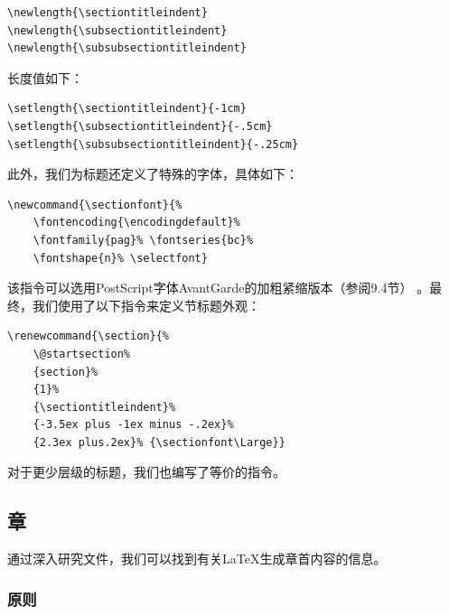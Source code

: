 \begin{dmd}
\begin{verbatim}
\newlength{\sectiontitleindent}
\newlength{\subsectiontitleindent}
\newlength{\subsubsectiontitleindent}
\end{verbatim}
\end{dmd}

长度值如下：

\begin{dmd}
\begin{verbatim}
\setlength{\sectiontitleindent}{-1cm}
\setlength{\subsectiontitleindent}{-.5cm}
\setlength{\subsubsectiontitleindent}{-.25cm}
\end{verbatim}
\end{dmd}

此外，我们为标题还定义了特殊的字体，具体如下：

\begin{dmd}
\begin{verbatim}
\newcommand{\sectionfont}{% 
    \fontencoding{\encodingdefault}% 
    \fontfamily{pag}% \fontseries{bc}%
    \fontshape{n}% \selectfont}
\end{verbatim}
\end{dmd}

该指令可以选用PostScript字体AvantGarde的加粗紧缩版本（参阅9.4节）%
。最终，我们使用了以下指令来定义节标题外观：

\begin{dmd}
\begin{verbatim}
\renewcommand{\section}{% 
    \@startsection%
    {section}%
    {1}%
    {\sectiontitleindent}%
    {-3.5ex plus -1ex minus -.2ex}% 
    {2.3ex plus.2ex}% {\sectionfont\Large}}
\end{verbatim}
\end{dmd}

对于更少层级的标题，我们也编写了等价的指令。

\subsection{章}

通过深入研究文件，我们可以找到有关\LaTeX 生成章首内容的信息。

\subsubsection{原则}

